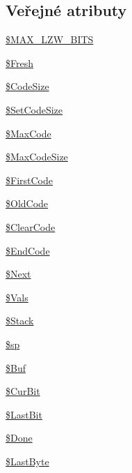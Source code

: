 \subsection*{Veřejné atributy}
\begin{DoxyCompactItemize}
\item 
\hyperlink{class_c_g_i_f_l_z_w_a414f88e2a8698fb6d7f12cd0b5ffd5db}{\$\-M\-A\-X\-\_\-\-L\-Z\-W\-\_\-\-B\-I\-T\-S}
\item 
\hyperlink{class_c_g_i_f_l_z_w_ad89ee46e21a2ea13fcdeffd422d6ac52}{\$\-Fresh}
\item 
\hyperlink{class_c_g_i_f_l_z_w_a852ba21e1a16e7f1075aa0f87e91e7f3}{\$\-Code\-Size}
\item 
\hyperlink{class_c_g_i_f_l_z_w_a0718d869dd834514add4cc4e979e6c7d}{\$\-Set\-Code\-Size}
\item 
\hyperlink{class_c_g_i_f_l_z_w_a0b8ce40209d82a47639c146b12d8384d}{\$\-Max\-Code}
\item 
\hyperlink{class_c_g_i_f_l_z_w_ae213898587328adcd63f63e2b4def909}{\$\-Max\-Code\-Size}
\item 
\hyperlink{class_c_g_i_f_l_z_w_af53567e4f02eec8490b182d4d7d3b215}{\$\-First\-Code}
\item 
\hyperlink{class_c_g_i_f_l_z_w_a5f1dbf14218ff6db0994b5519b3bd7de}{\$\-Old\-Code}
\item 
\hyperlink{class_c_g_i_f_l_z_w_a1f9c34dca38e306b4da75994d5d401c0}{\$\-Clear\-Code}
\item 
\hyperlink{class_c_g_i_f_l_z_w_add93ec110af125c91fba8e25c2e92179}{\$\-End\-Code}
\item 
\hyperlink{class_c_g_i_f_l_z_w_aa8b6dfebe472aebfcc74fefcc909f5ea}{\$\-Next}
\item 
\hyperlink{class_c_g_i_f_l_z_w_aa878298bf449195f416bf2aa396b99d5}{\$\-Vals}
\item 
\hyperlink{class_c_g_i_f_l_z_w_ace6b3e549ba14d8b44a6bd216d9d70fc}{\$\-Stack}
\item 
\hyperlink{class_c_g_i_f_l_z_w_a05cea57537d62249b3a42c1ef2031f2b}{\$sp}
\item 
\hyperlink{class_c_g_i_f_l_z_w_af0e5e92b7112d71e7d5bab2054f65e75}{\$\-Buf}
\item 
\hyperlink{class_c_g_i_f_l_z_w_a9c70e31ce175975d7499d7fb5982c24a}{\$\-Cur\-Bit}
\item 
\hyperlink{class_c_g_i_f_l_z_w_ab1aaf260e0a6b6a1ec08d1837d6256c5}{\$\-Last\-Bit}
\item 
\hyperlink{class_c_g_i_f_l_z_w_a5e6b8609846fbbaba7fc007403995676}{\$\-Done}
\item 
\hyperlink{class_c_g_i_f_l_z_w_aff79bffa0202cba726df5d7609e6fa55}{\$\-Last\-Byte}
\end{DoxyCompactItemize}


